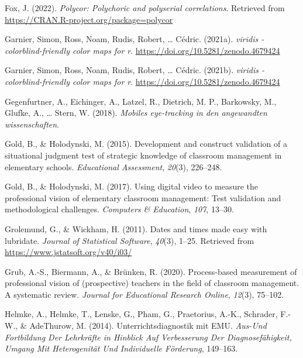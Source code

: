 \documentclass[
  man]{apa6}
\newlength{\cslhangindent}
\newenvironment{CSLReferences}[2] %
 {\begin{list}{}{%
  \setlength{\itemindent}{0pt}
  \setlength{\leftmargin}{0pt}
  \setlength{\parsep}{0pt}
  \ifodd #1
   \setlength{\leftmargin}{\cslhangindent}
   \setlength{\itemindent}{-1\cslhangindent}
  \fi
  \setlength{\itemsep}{#2\baselineskip}}}
 {\end{list}}
\begin{document}
\begin{CSLReferences}{1}{0}
Fox, J. (2022). \emph{Polycor: Polychoric and polyserial correlations}. Retrieved from \url{https://CRAN.R-project.org/package=polycor}

Garnier, Simon, Ross, Noam, Rudis, Robert, \ldots{} Cédric. (2021a). \emph{{viridis} - colorblind-friendly color maps for r}. \url{https://doi.org/10.5281/zenodo.4679424}

Garnier, Simon, Ross, Noam, Rudis, Robert, \ldots{} Cédric. (2021b). \emph{{viridis} - colorblind-friendly color maps for r}. \url{https://doi.org/10.5281/zenodo.4679424}

Gegenfurtner, A., Eichinger, A., Latzel, R., Dietrich, M. P., Barkowsky, M., Glufke, A., \ldots{} Stern, W. (2018). \emph{Mobiles eye-tracking in den angewandten wissenschaften}.

Gold, B., \& Holodynski, M. (2015). Development and construct validation of a situational judgment test of strategic knowledge of classroom management in elementary schools. \emph{Educational Assessment}, \emph{20}(3), 226--248.

Gold, B., \& Holodynski, M. (2017). Using digital video to measure the professional vision of elementary classroom management: Test validation and methodological challenges. \emph{Computers \& Education}, \emph{107}, 13--30.

Grolemund, G., \& Wickham, H. (2011). Dates and times made easy with {lubridate}. \emph{Journal of Statistical Software}, \emph{40}(3), 1--25. Retrieved from \url{https://www.jstatsoft.org/v40/i03/}

Grub, A.-S., Biermann, A., \& Brünken, R. (2020). Process-based measurement of professional vision of (prospective) teachers in the field of classroom management. A systematic review. \emph{Journal for Educational Research Online}, \emph{12}(3), 75--102.

Helmke, A., Helmke, T., Lenske, G., Pham, G., Praetorius, A.-K., Schrader, F.-W., \& AdeThurow, M. (2014). Unterrichtsdiagnostik mit EMU. \emph{Aus-Und Fortbildung Der Lehrkr{ä}fte in Hinblick Auf Verbesserung Der Diagnosef{ä}higkeit, Umgang Mit Heterogenit{ä}t Und Individuelle F{ö}rderung}, 149--163.


\end{CSLReferences}
\end{document}
